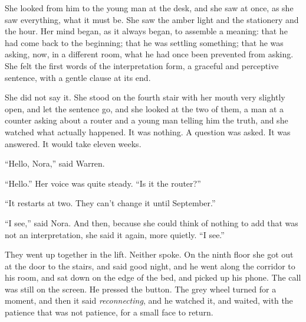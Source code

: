 She looked from him to the young man at the desk, and she saw at once, as she saw everything, what it must be. She saw the amber light and the stationery and the hour. Her mind began, as it always began, to assemble a meaning: that he had come back to the beginning; that he was settling something; that he was asking, now, in a different room, what he had once been prevented from asking. She felt the first words of the interpretation form, a graceful and perceptive sentence, with a gentle clause at its end.

She did not say it. She stood on the fourth stair with her mouth very slightly open, and let the sentence go, and she looked at the two of them, a man at a counter asking about a router and a young man telling him the truth, and she watched what actually happened. It was nothing. A question was asked. It was answered. It would take eleven weeks.

``Hello, Nora,'' said Warren.

``Hello.'' Her voice was quite steady. ``Is it the router?''

``It restarts at two. They can't change it until September.''

``I see,'' said Nora. And then, because she could think of nothing to add that was not an interpretation, she said it again, more quietly. ``I see.''

They went up together in the lift. Neither spoke. On the ninth floor she got out at the door to the stairs, and said good night, and he went along the corridor to his room, and sat down on the edge of the bed, and picked up his phone. The call was still on the screen. He pressed the button. The grey wheel turned for a moment, and then it said \emph{reconnecting}, and he watched it, and waited, with the patience that was not patience, for a small face to return.



